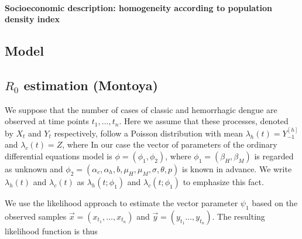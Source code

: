 \documentclass[draft, openbib]{imammb}
\numberwithin{equation}{section}
\begin{document}
            \paragraph{Socioeconomic description: 
                homogeneity according to population density index}
        \subsection*{Model}
            
            
            
        \subsection{$R_0$ estimation (Montoya)}
        We suppose that the number of cases of classic and hemorrhagic
        dengue are observed at time points $t_{1}, \dots , t_{n}$.
        Here we assume that these processes, denoted by $X_{t}$ and
        $Y_{t}$ respectively, follow a Poisson distribution with mean
        $\lambda_{h}\left(t\right)=Y_{-1}^{[h]}$ and
        $\lambda_{c}\left(t\right)=Z$, where
        In our case the vector of parameters of the ordinary differential
        equations model is $\phi=\left(\phi_{1},\phi_{2}\right)$, where
        $\phi_{1}=\left(\beta_{H},\beta_{M}\right)$ is regarded as unknown and
        $\phi_{2}=\left(\alpha_{c},\alpha_{h},b,\mu_{H},\mu_{M},\sigma,\theta,p\right)$
        is known in advance. We write $\lambda_{h}\left(t\right)$ and
        $\lambda_{c}\left(t\right)$ as $\lambda_{h}\left(t;\phi_{1}\right)$
        and $\lambda_{c}\left(t;\phi_{1}\right)$ to emphasize this fact.
 
        We use the likelihood approach to estimate the vector
        parameter  $\psi_{1}$ based on the observed samples
        $\vec{x}=\left(x_{t_1}, \dots , x_{t_n} \right)$ and
        $\vec{y}=\left(y_{t_1} \dots , y_{t_n} \right)$. The resulting
        likelihood function is thus
\end{document}
